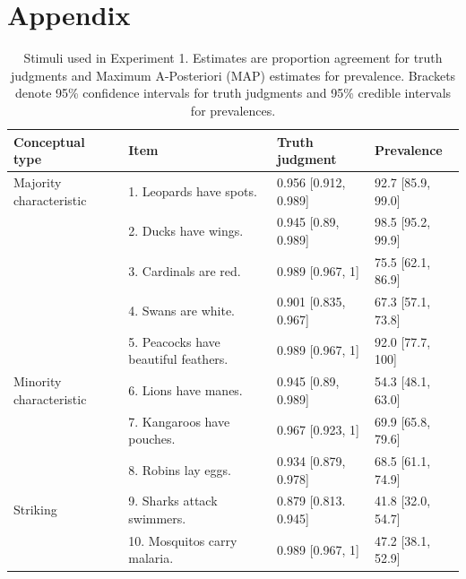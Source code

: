 \documentclass[12pt,letterpaper]{article}
\begin{document}
\newpage


\setlength{\bibleftmargin}{.125in}
\setlength{\bibindent}{-\bibleftmargin}



\newpage

\section*{Appendix}



\begin{table}[h]
\centering

\caption{Stimuli used in Experiment 1. 
Estimates are proportion agreement for truth judgments and Maximum A-Posteriori (MAP) estimates for prevalence. 
Brackets denote 95\% confidence intervals for truth judgments and 95\% credible intervals for prevalences.}
\begin{tabular}{| l | l | p{3.5cm} | p{3.5cm} |}
\hline
Conceptual type & Item & Truth judgment & Prevalence \\
\hline \hline
Majority characteristic       & 1. Leopards have spots.    &0.956	[0.912, 0.989] & 92.7 [85.9, 99.0]\\
                                          & 2. Ducks have wings.                       &0.945	[0.89, 0.989] & 98.5 [95.2, 99.9]\\
                                          & 3. Cardinals are red.                       &0.989	[0.967, 1] & 75.5 [62.1, 86.9]\\
                                          & 4. Swans are white.                       &0.901	[0.835, 0.967] & 67.3 [57.1, 73.8] \\
                                          & 5. Peacocks have beautiful feathers. &  0.989	[0.967, 1] & 92.0 [77.7, 100] \\
Minority characteristic       & 6. Lions have manes.       &0.945	[0.89, 0.989] & 54.3 [48.1, 63.0]\\
                                          & 7. Kangaroos have pouches.                        &0.967 [0.923, 1]& 69.9 [65.8, 79.6]\\
                                          & 8. Robins lay eggs.                        &0.934	[0.879, 0.978]& 68.5 [61.1, 74.9]\\
Striking                      & 9. Sharks attack swimmers. &0.879	[0.813. 0.945] & 41.8 [32.0, 54.7]\\
                                  & 10. Mosquitos carry malaria.                        &0.989	[0.967, 1] & 47.2 [38.1,	 52.9]\\

\end{tabular}
\end{table}
\end{document}
